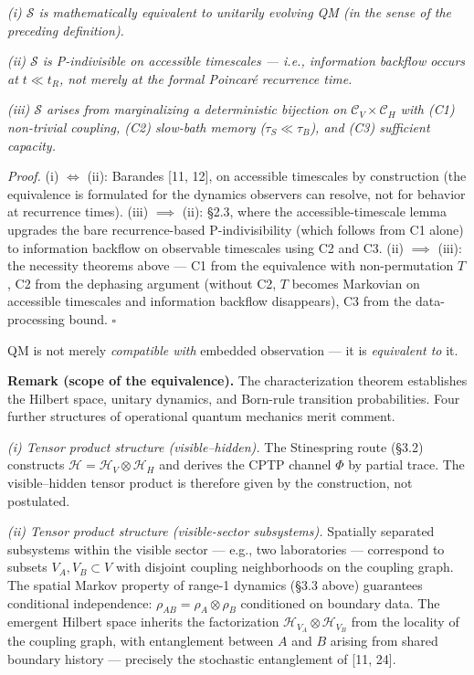 \documentclass[
]{article}
\begin{document}
\emph{(i) \(\mathcal{S}\) is mathematically equivalent to unitarily
evolving QM (in the sense of the preceding definition).}

\emph{(ii) \(\mathcal{S}\) is P-indivisible on accessible timescales ---
i.e., information backflow occurs at \(t \ll t_R\), not merely at the
formal Poincaré recurrence time.}

\emph{(iii) \(\mathcal{S}\) arises from marginalizing a deterministic
bijection on \(\mathcal{C}_V \times \mathcal{C}_H\) with (C1)
non-trivial coupling, (C2) slow-bath memory (\(\tau_S \ll \tau_B\)), and
(C3) sufficient capacity.}

\emph{Proof.} (i) \(\iff\) (ii): Barandes {[}11, 12{]}, on accessible
timescales by construction (the equivalence is formulated for the
dynamics observers can resolve, not for behavior at recurrence times).
(iii) \(\implies\) (ii): §2.3, where the accessible-timescale lemma
upgrades the bare recurrence-based P-indivisibility (which follows from
C1 alone) to information backflow on observable timescales using C2 and
C3. (ii) \(\implies\) (iii): the necessity theorems above --- C1 from
the equivalence with non-permutation \(T\), C2 from the dephasing
argument (without C2, \(T\) becomes Markovian on accessible timescales
and information backflow disappears), C3 from the data-processing bound.
\(\square\)

QM is not merely \emph{compatible with} embedded observation --- it is
\emph{equivalent to} it.

\textbf{Remark (scope of the equivalence).} The characterization theorem
establishes the Hilbert space, unitary dynamics, and Born-rule
transition probabilities. Four further structures of operational quantum
mechanics merit comment.

\emph{(i) Tensor product structure (visible--hidden).} The Stinespring
route (§3.2) constructs
\(\mathcal{H} = \mathcal{H}_V \otimes \mathcal{H}_H\) and derives the
CPTP channel \(\Phi\) by partial trace. The visible--hidden tensor
product is therefore given by the construction, not postulated.

\emph{(ii) Tensor product structure (visible-sector subsystems).}
Spatially separated subsystems within the visible sector --- e.g., two
laboratories --- correspond to subsets \(V_A, V_B \subset V\) with
disjoint coupling neighborhoods on the coupling graph. The spatial
Markov property of range-1 dynamics (§3.3 above) guarantees conditional
independence: \(\rho_{AB} = \rho_A \otimes \rho_B\) conditioned on
boundary data. The emergent Hilbert space inherits the factorization
\(\mathcal{H}_{V_A} \otimes \mathcal{H}_{V_B}\) from the locality of the
coupling graph, with entanglement between \(A\) and \(B\) arising from
shared boundary history --- precisely the stochastic entanglement of
{[}11, 24{]}.
\end{document}
